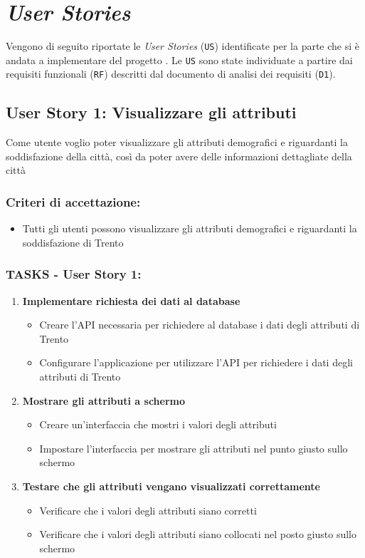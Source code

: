 \chapter{\textit{User Stories}}
Vengono di seguito riportate le \textit{User Stories} (\texttt{US}) identificate per la parte che si è andata a implementare del progetto \ProjectTitle. Le \texttt{US} sono state individuate a partire dai requisiti funzionali (\texttt{RF}) descritti dal documento di analisi dei requisiti (\texttt{D1}).

\section*{User Story 1: Visualizzare gli attributi}
    Come utente voglio poter visualizzare gli attributi demografici e riguardanti la soddisfazione della città, così da poter avere delle informazioni dettagliate della città
    \subsection*{Criteri di accettazione:}
            \begin{itemize}
                \item Tutti gli utenti possono visualizzare gli attributi demografici e riguardanti la soddisfazione di Trento
            \end{itemize}
    \subsection*{TASKS - User Story 1:}
        \begin{enumerate}
            \item \textbf{Implementare richiesta dei dati al database}  
                \begin{itemize}  
                    \item Creare l'API necessaria per richiedere al database i dati degli attributi di Trento
                    \item Configurare l'applicazione per utilizzare l'API per richiedere i dati degli attributi di Trento
                \end{itemize}
            \item \textbf{Mostrare gli attributi a schermo} 
                \begin{itemize}
                    \item Creare un'interfaccia che mostri i valori degli attributi
                    \item Impostare l'interfaccia per mostrare gli attributi nel punto giusto sullo schermo
                \end{itemize}
            \item \textbf{Testare che gli attributi vengano visualizzati correttamente} 
                \begin{itemize}
                    \item Verificare che i valori degli attributi siano corretti
                    \item Verificare che i valori degli attributi siano collocati nel posto giusto sullo schermo
                \end{itemize}
        \end{enumerate}
